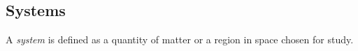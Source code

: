 \subsection{Systems}\label{subsec:Systems}
\begin{definition}[System]\label{def:System}
  A \emph{system} is defined as a quantity of matter or a region in space chosen for study.
\end{definition}


